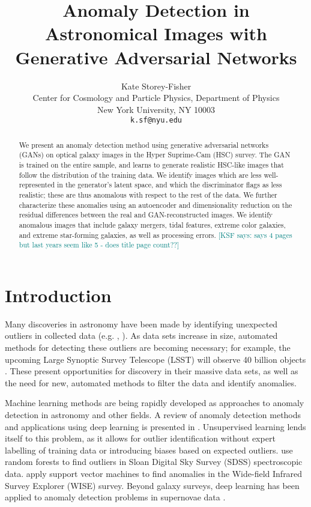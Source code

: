 \documentclass{article}
\title{Anomaly Detection in Astronomical Images with Generative Adversarial Networks}
\author{%
  {Kate Storey-Fisher} \\
  Center for Cosmology and Particle Physics, Department of Physics \\
  New York University, NY 10003 \\
  \texttt{k.sf@nyu.edu} \\
}
\newcommand{\KSF}[1]{\textcolor{teal}{{[KSF says: #1]}}}
\begin{document}
\maketitle

\begin{abstract}
    We present an anomaly detection method using generative adversarial networks (GANs) on optical galaxy images in the Hyper Suprime-Cam (HSC) survey.
    The GAN is trained on the entire sample, and learns to generate realistic HSC-like images that follow the distribution of the training data.
    We identify images which are less well-represented in the generator's latent space, and which the discriminator flags as less realistic; these are thus anomalous with respect to the rest of the data.
    We further characterize these anomalies using an autoencoder and dimensionality reduction on the residual differences between the real and GAN-reconstructed images.
    We identify anomalous images that include galaxy mergers, tidal features, extreme color galaxies, and extreme star-forming galaxies, as well as processing errors.
    \KSF{says 4 pages but last years seem like 5 - does title page count??}
\end{abstract}

\section{Introduction}


Many discoveries in astronomy have been made by identifying unexpected outliers in collected data (e.g. \citealt{Cardamone2009}, \citealt{Massey2019}). 
As data sets increase in size, automated methods for detecting these outliers are becoming necessary; for example, the upcoming Large Synoptic Survey Telescope (LSST) will observe 40 billion objects \citep{Ivezic2018}.
These present opportunities for discovery in their massive data sets, as well as the need for new, automated methods to filter the data and identify anomalies.

Machine learning methods are being rapidly developed as approaches to anomaly detection in astronomy and other fields.
A review of anomaly detection methods and applications using deep learning is presented in \cite{Chalapathy2019}.
Unsupervised learning lends itself to this problem, as it allows for outlier identification without expert labelling of training data or introducing biases based on expected outliers.
\cite{Baron2017} use random forests to find outliers in Sloan Digital Sky Survey (SDSS) spectroscopic data.
\cite{Solarz2017} apply support vector machines to find anomalies in the Wide-field Infrared Survey Explorer (WISE) survey.
Beyond galaxy surveys, deep learning has been applied to anomaly detection problems in supernovae data \citep{Pruzhinskaya2019}. 
\end{document}
